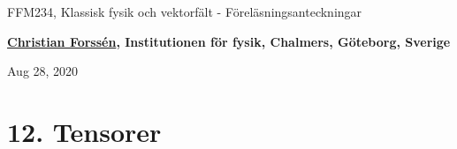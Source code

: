 \documentclass[%
oneside,                 %
final,                   %
10pt]{article}
\begin{document}

\newcommand{\exercisesection}[1]{\subsection*{#1}}







\thispagestyle{empty}

\begin{center}
{\LARGE\bf
\begin{spacing}{1.25}
FFM234, Klassisk fysik och vektorfält - Föreläsningsanteckningar
\end{spacing}
}
\end{center}


\begin{center}
{\bf \href{{http://fy.chalmers.se/subatom/tsp/}}{Christian Forssén}, Institutionen för fysik, Chalmers, Göteborg, Sverige${}^{}$} \\ [0mm]
\end{center}

\begin{center}
\end{center}
    

\begin{center}
Aug 28, 2020
\end{center}

\vspace{1cm}


\section*{12. Tensorer}
\end{document}
